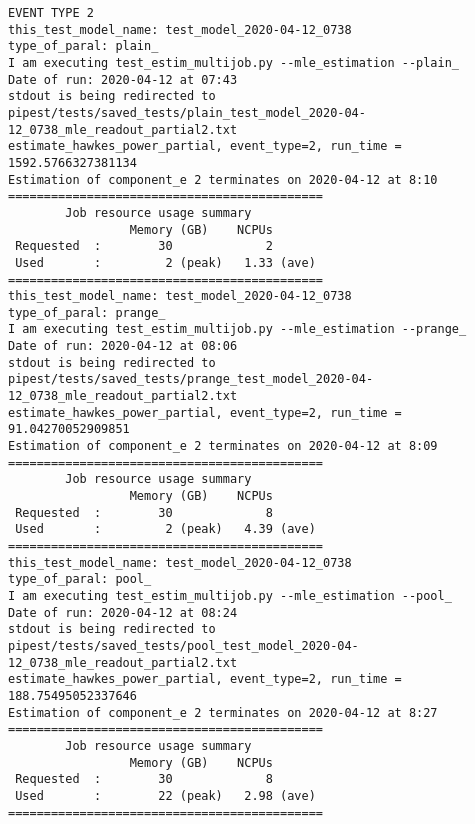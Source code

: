  \begin{Verbatim}[commandchars=\\\{\}, fontsize=\small]
EVENT TYPE 2
this_test_model_name: test_model_2020-04-12_0738
type_of_paral: plain_
I am executing test_estim_multijob.py --mle_estimation --plain_
Date of run: 2020-04-12 at 07:43
stdout is being redirected to pipest/tests/saved_tests/plain_test_model_2020-04-12_0738_mle_readout_partial2.txt
estimate_hawkes_power_partial, event_type=2, run_time = 1592.5766327381134
Estimation of component_e 2 terminates on 2020-04-12 at 8:10
============================================
        Job resource usage summary 
                 Memory (GB)    NCPUs
 Requested  :        30             2
 Used       :         2 (peak)   1.33 (ave)
============================================
this_test_model_name: test_model_2020-04-12_0738
type_of_paral: prange_
I am executing test_estim_multijob.py --mle_estimation --prange_
Date of run: 2020-04-12 at 08:06
stdout is being redirected to pipest/tests/saved_tests/prange_test_model_2020-04-12_0738_mle_readout_partial2.txt
estimate_hawkes_power_partial, event_type=2, run_time = 91.04270052909851
Estimation of component_e 2 terminates on 2020-04-12 at 8:09
============================================
        Job resource usage summary 
                 Memory (GB)    NCPUs
 Requested  :        30             8
 Used       :         2 (peak)   4.39 (ave)
============================================
this_test_model_name: test_model_2020-04-12_0738
type_of_paral: pool_
I am executing test_estim_multijob.py --mle_estimation --pool_
Date of run: 2020-04-12 at 08:24
stdout is being redirected to pipest/tests/saved_tests/pool_test_model_2020-04-12_0738_mle_readout_partial2.txt
estimate_hawkes_power_partial, event_type=2, run_time = 188.75495052337646
Estimation of component_e 2 terminates on 2020-04-12 at 8:27
============================================
        Job resource usage summary 
                 Memory (GB)    NCPUs
 Requested  :        30             8
 Used       :        22 (peak)   2.98 (ave)
============================================
 \end{Verbatim}
